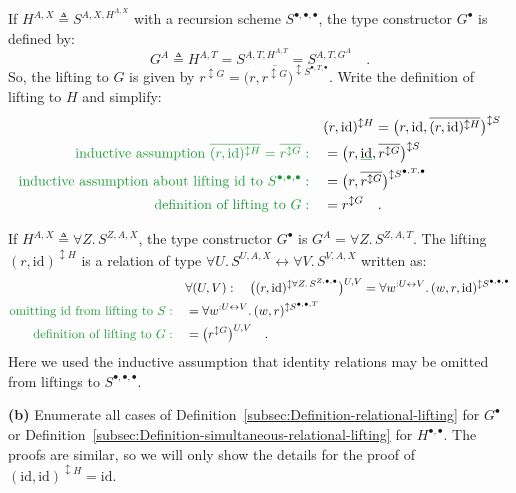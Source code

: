 If $H^{A,X}\triangleq S^{A,X,H^{A,X}}$ with a recursion scheme $S^{\bullet,\bullet,\bullet}$,
the type constructor $G^{\bullet}$ is defined by: 
\[
G^{A}\triangleq H^{A,T}=S^{A,T,H^{A,T}}=S^{A,T,G^{A}}\quad.
\]
So, the lifting to $G$ is given by $r^{\updownarrow G}=\big(r,\overline{r^{\updownarrow G}}\big)^{\updownarrow S^{\bullet,T,\bullet}}$.
Write the definition of lifting to $H$ and simplify:
\begin{align*}
 & (r,\text{id})^{\updownarrow H}=\big(r,\text{id},\overline{(r,\text{id})^{\updownarrow H}}\big)^{\updownarrow S}\\
{\color{greenunder}\text{inductive assumption }\overline{(r,\text{id})^{\updownarrow H}}=\overline{r^{\updownarrow G}}:}\quad & =\big(r,\gunderline{\text{id}},\overline{r^{\updownarrow G}}\big)^{\updownarrow S}\\
{\color{greenunder}\text{inductive assumption about lifting id to }S^{\bullet,\bullet,\bullet}:}\quad & =\big(r,\overline{r^{\updownarrow G}}\big)^{\updownarrow S^{\bullet,T,\bullet}}\\
{\color{greenunder}\text{definition of lifting to }G:}\quad & =r^{\updownarrow G}\quad.
\end{align*}

If $H^{A,X}\triangleq\forall Z.\,S^{Z,A,X}$, the type constructor
$G^{\bullet}$ is $G^{A}=\forall Z.\,S^{Z,A,T}$. The lifting $(r,\text{id})^{\updownarrow H}$
is a relation of type $\forall U.\,S^{U,A,X}\leftrightarrow\forall V.\,S^{V,A,X}$
written as:
\begin{align*}
 & \forall(U,V):\quad\big((r,\text{id})^{\updownarrow\forall Z.\,S^{Z,\bullet,\bullet}}\big)^{U,V}=\forall w^{:U\leftrightarrow V}.\,(w,r,\text{id})^{\updownarrow S^{\bullet,\bullet,\bullet}}\\
{\color{greenunder}\text{omitting id from lifting to }S:}\quad & =\forall w^{:U\leftrightarrow V}.\,(w,r)^{\updownarrow S^{\bullet,\bullet,T}}\\
{\color{greenunder}\text{definition of lifting to }G:}\quad & =\big(r^{\updownarrow G}\big)^{U,V}\quad.
\end{align*}
Here we used the inductive assumption that identity relations may
be omitted from liftings to $S^{\bullet,\bullet,\bullet}$.

\textbf{(b)} Enumerate all cases of Definition~\ref{subsec:Definition-relational-lifting}
for $G^{\bullet}$ or Definition~\ref{subsec:Definition-simultaneous-relational-lifting}
for $H^{\bullet,\bullet}$. The proofs are similar, so we will only
show the details for the proof of $(\text{id},\text{id})^{\updownarrow H}=\text{id}$.

